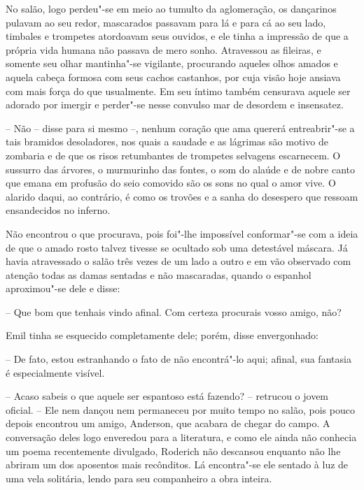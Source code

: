 No salão, logo perdeu"-se em meio ao tumulto da aglomeração, os
dançarinos pulavam ao seu redor, mascarados passavam para lá e para cá
ao seu lado, timbales e trompetes atordoavam seus ouvidos, e ele tinha
a impressão de que a própria vida humana não passava de mero sonho.
Atravessou as fileiras, e somente seu olhar mantinha"-se vigilante,
procurando aqueles olhos amados e aquela \mbox{cabeça} formosa com seus cachos
castanhos, por cuja visão hoje ansiava com mais força do que
usualmente. Em seu íntimo também censurava aquele ser adorado por
imergir e perder"-se nesse convulso mar de desordem e insensatez.

-- Não -- disse para si mesmo --, nenhum coração que ama quererá
entreabrir"-se a tais bramidos desoladores, nos quais a saudade e as
lágrimas são motivo de zombaria e de que os risos retumbantes de
trompetes selvagens escarnecem. O sussurro das árvores, o murmurinho
das fontes, o som do alaúde e de nobre canto que emana em profusão do
seio comovido são os sons no qual o amor vive. O alarido daqui, ao
contrário, é como os trovões e a sanha do desespero que ressoam
ensandecidos no inferno.

Não encontrou o que procurava, pois foi"-lhe impossível conformar"-se com
a ideia de que o amado rosto talvez tivesse se ocultado sob uma
detestável máscara. Já havia atravessado o salão três vezes de um lado
a outro e em vão observado com atenção todas as damas sentadas e não
mascaradas, quando o espanhol aproximou"-se dele e disse:

-- Que bom que tenhais vindo afinal. Com certeza procurais vosso
amigo, não?

Emil tinha se esquecido completamente dele; porém, disse envergonhado:

-- De fato, estou estranhando o fato de não encontrá"-lo aqui;
afinal, sua fantasia é especialmente visível.

-- Acaso sabeis o que aquele ser espantoso está fazendo? -- retrucou
o jovem oficial. -- Ele nem dançou nem permaneceu por muito tempo no
salão, pois pouco depois encontrou um amigo, Anderson, que acabara de
chegar do campo. A conversação deles logo enveredou para a literatura,
e como ele ainda não conhecia um poema recentemente divulgado, Roderich
não descansou enquanto não lhe abriram um dos aposentos mais
recônditos. Lá encontra"-se ele sentado à luz de uma vela solitária,
lendo para seu companheiro a obra inteira.

